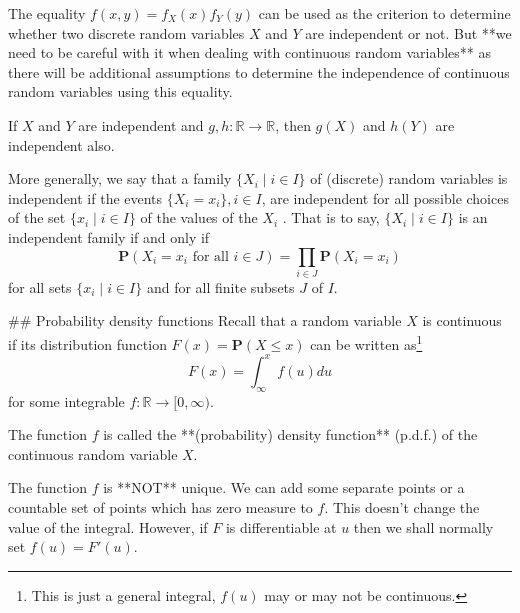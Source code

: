 \begin{remark}
The equality $f(x,y) = f_X(x) f_Y(y)$ can be used as the criterion to determine whether two discrete random variables $X$ and $Y$ are independent or not. But **we need to be careful with it when dealing with continuous random variables** as there will be additional assumptions to determine the independence of continuous random variables using this equality.
\end{remark}

\begin{theorem}
If $X$ and $Y$ are independent and $g, h: \mathbb{R} \to \mathbb{R}$, then $g(X)$ and $h(Y)$ are independent also. 
\end{theorem}

More generally, we say that a family $\{ X_i \;\vert\; i \in I\}$ of (discrete) random variables is independent if the events $\{X_i = x_i \}, i \in I$, are independent for all possible choices of the set $\{x_i \;\vert\; i \in I\}$ of the values of the $X_i$ . That is to say, $\{X_i \;\vert\; i \in I \}$ is an independent family if and only if 
\begin{equation*}
    \mathbf{P}(X_i = x_i \text{ for all }i\in J) = \prod_{i\in J} \mathbf{P}(X_i = x_i)
\end{equation*}
for all sets $\{x_i \;\vert\; i \in I\}$ and for all finite subsets $J$ of $I$.


## Probability density functions
Recall that a random variable $X$ is continuous if its distribution function $F(x) = \mathbf{P}(X \leq x)$ can be written as\footnote{This is just a general integral, $f(u)$ may or may not be continuous.}
\begin{equation*}
    F(x) = \int_{\infty}^x f(u)du
\end{equation*}
for some integrable $f: \mathbb{R} \to [0, \infty)$.

\begin{definition}
The function $f$ is called the **(probability) density function** (p.d.f.) of the continuous random variable $X$. 
\end{definition}

\begin{remark}
The function $f$ is **NOT** unique. We can add some separate points or a countable set of points which has zero measure to $f$. This doesn't change the value of the integral. However, if $F$ is differentiable at $u$ then we shall normally set $f(u) = F'(u)$. 
\end{remark}

